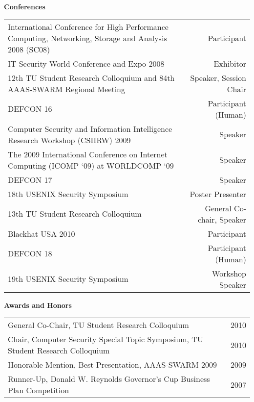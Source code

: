 \documentclass[letterpaper,11pt]{article}
\newcommand{\resheading}[1]{{\large \colorbox{mygrey}{\begin{minipage}
    {\textwidth}{\textbf{#1 \vphantom{p\^{E}}}}\end{minipage}}}}
\begin{document}
\resheading{Conferences}
\begin{center}
	\begin{tabular*}{6.5in}{m{5in}@{\extracolsep{\fill}}r}
		International Conference for High Performance Computing, Networking, Storage and Analysis 2008 (SC08) & Participant \\
		IT Security World Conference and Expo 2008 & Exhibitor \\
		12th TU Student Research Colloquium and 84th AAAS-SWARM Regional Meeting & Speaker, Session Chair \\
		DEFCON 16 & Participant (Human) \\
		Computer Security and Information Intelligence Research Workshop (CSIIRW) 2009 & Speaker \\
		The 2009 International Conference on Internet Computing (ICOMP `09) at WORLDCOMP `09 & Speaker \\
		DEFCON 17 & Speaker \\
		18th USENIX Security Symposium & Poster Presenter \\
		13th TU Student Research Colloquium & General Co-chair, Speaker \\
		Blackhat USA 2010 & Participant \\
		DEFCON 18 & Participant (Human) \\
		19th USENIX Security Symposium & Workshop Speaker \\
	\end{tabular*}
\end{center}

\resheading{Awards and Honors}
\begin{center}
	\begin{tabular*}{6.5in}{l@{\extracolsep{\fill}}r}
		General Co-Chair, TU Student Research Colloquium & 2010 \\
		Chair, Computer Security Special Topic Symposium, TU Student Research Colloquium & 2010 \\
		Honorable Mention, Best Presentation, AAAS-SWARM 2009 & 2009 \\
		Runner-Up, Donald W. Reynolds Governor's Cup Business Plan Competition & 2007\\
	\end{tabular*}
\end{center}
\end{document}
